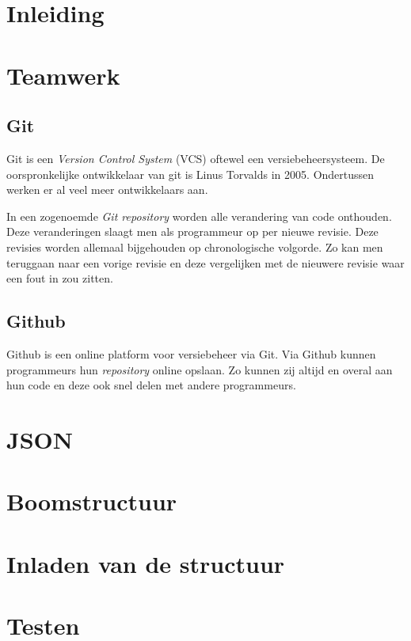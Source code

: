 \section{Inleiding}

\section{Teamwerk}
\subsection{Git}
Git is een \textit{Version Control System} (VCS) oftewel een versiebeheersysteem. De oorspronkelijke ontwikkelaar van git is Linus Torvalds in 2005.\cite{init_git} Ondertussen werken er al veel meer ontwikkelaars aan.

In een zogenoemde \textit{Git repository} worden alle verandering van code onthouden. Deze veranderingen slaagt men als programmeur op per nieuwe revisie. Deze revisies worden allemaal bijgehouden op chronologische volgorde. Zo kan men teruggaan naar een vorige revisie en deze vergelijken met de nieuwere revisie waar een fout in zou zitten.
\subsection{Github}
Github is een online platform voor versiebeheer via Git. Via Github kunnen programmeurs hun \textit{repository} online opslaan. Zo kunnen zij altijd en overal aan hun code en deze ook snel delen met andere programmeurs.

\section{JSON}


\section{Boomstructuur}

\section{Inladen van de structuur}

\section{Testen}

